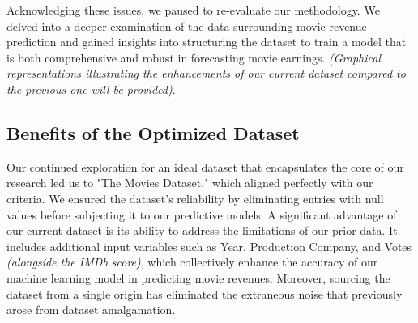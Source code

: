 \documentclass[conference]{IEEEtran}
\begin{document}
        Acknowledging these issues, we paused to re-evaluate our methodology. We delved into a deeper examination of the data surrounding movie revenue prediction and gained insights into structuring the dataset to train a model that is both comprehensive and robust in forecasting movie earnings. \textit{(Graphical representations illustrating the enhancements of our current dataset compared to the previous one will be provided)}.
    
    \subsection{Benefits of the Optimized Dataset}
        Our continued exploration for an ideal dataset that encapsulates the core of our research led us to "The Movies Dataset," which aligned perfectly with our criteria. We ensured the dataset's reliability by eliminating entries with null values before subjecting it to our predictive models. A significant advantage of our current dataset is its ability to address the limitations of our prior data. It includes additional input variables such as Year, Production Company, and Votes \textit{(alongside the IMDb score)}, which collectively enhance the accuracy of our machine learning model in predicting movie revenues. Moreover, sourcing the dataset from a single origin has eliminated the extraneous noise that previously arose from dataset amalgamation.
\end{document}
